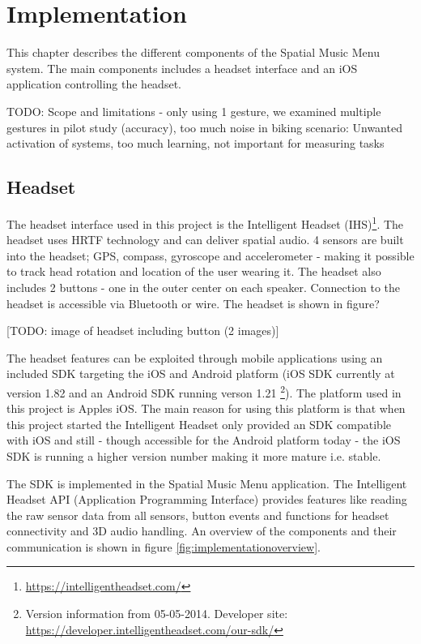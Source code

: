 \chapter{Implementation}
This chapter describes the different components of the Spatial Music Menu system. The main components includes a headset interface and an iOS application controlling the headset.

TODO: Scope and limitations
- only using 1 gesture, we examined multiple gestures in pilot study (accuracy), too much noise in biking scenario: Unwanted activation of systems, too much learning, not important for measuring tasks

\section{Headset}
The headset interface used in this project is the Intelligent Headset (IHS)\footnote{\url{https://intelligentheadset.com/}}. The headset uses HRTF technology and can deliver spatial audio. 4 sensors are built into the headset; GPS, compass, gyroscope and accelerometer - making it possible to track head rotation and location of the user wearing it. The headset also includes 2 buttons - one in the outer center on each speaker. Connection to the headset is accessible via Bluetooth or wire. The headset is shown in figure?

[TODO: image of headset including button (2 images)]

The headset features can be exploited through mobile applications using an included SDK targeting the iOS and Android platform (iOS SDK currently at version 1.82 and an Android SDK running verson 1.21 \footnote{Version information from 05-05-2014. Developer site: \url{https://developer.intelligentheadset.com/our-sdk/}}). The platform used in this project is Apples iOS. The main reason for using this platform is that when this project started the Intelligent Headset only provided an SDK compatible with iOS and still - though accessible for the Android platform today - the iOS SDK is running a higher version number making it more mature i.e. stable.

The SDK is implemented in the Spatial Music Menu application. The Intelligent Headset API (Application Programming Interface) provides features like reading the raw sensor data from all sensors, button events and functions for headset connectivity and 3D audio handling. An overview of the components and their communication is shown in figure \ref{fig:implementationoverview}.

